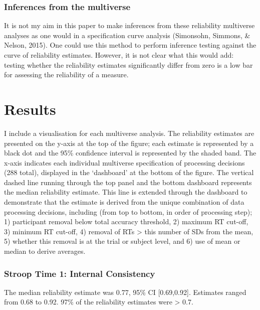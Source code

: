 \documentclass[
  english,
  man,floatsintext]{apa6}
\begin{document}
\hypertarget{inferences-from-the-multiverse}{%
\subsubsection{Inferences from the multiverse}\label{inferences-from-the-multiverse}}

It is not my aim in this paper to make inferences from these reliability multiverse analyses as one would in a specification curve analysis (Simonsohn, Simmons, \& Nelson, 2015). One could use this method to perform inference testing against the curve of reliability estimates. However, it is not clear what this would add: testing whether the reliability estimates significantly differ from zero is a low bar for assessing the reliability of a measure.

\hypertarget{results}{%
\section{Results}\label{results}}

I include a visualisation for each multiverse analysis. The reliability estimates are presented on the y-axis at the top of the figure; each estimate is represented by a black dot and the 95\% confidence interval is represented by the shaded band. The x-axis indicates each individual multiverse specification of processing decisions (288 total), displayed in the `dashboard' at the bottom of the figure. The vertical dashed line running through the top panel and the bottom dashboard represents the median reliability estimate. This line is extended through the dashboard to demonstrate that the estimate is derived from the unique combination of data processing decisions, including (from top to bottom, in order of processing step); 1) participant removal below total accuracy threshold, 2) maximum RT cut-off, 3) minimum RT cut-off, 4) removal of RTs \textgreater{} this number of SDs from the mean, 5) whether this removal is at the trial or subject level, and 6) use of mean or median to derive averages.

\newpage

\hypertarget{stroop-time-1-internal-consistency}{%
\subsubsection{Stroop Time 1: Internal Consistency}\label{stroop-time-1-internal-consistency}}

The median reliability estimate was 0.77, 95\% CI {[}0.69,0.92{]}. Estimates ranged from 0.68 to 0.92. 97\% of the reliability estimates were \textgreater{} 0.7.
\end{document}
